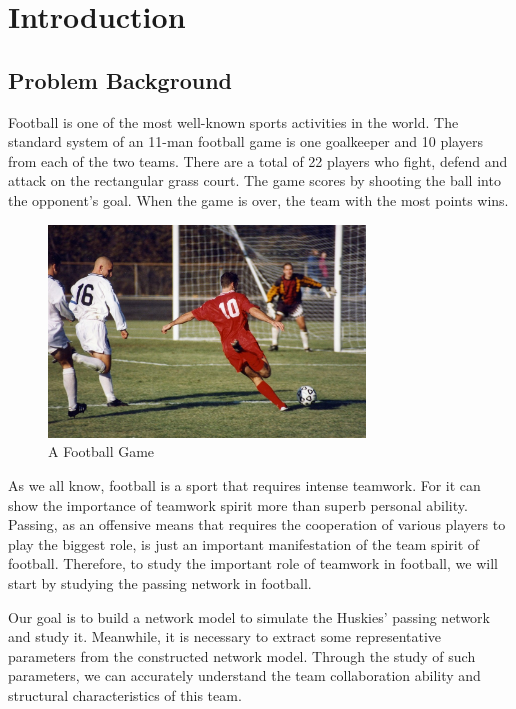 \documentclass{mcmthesis}
\begin{document}
\maketitle

\tableofcontents

\newpage

\section{Introduction}
\subsection{Problem Background}
	Football is one of the most well-known sports activities in the world.  The standard system of an 11-man football game is one goalkeeper and 10 players from each of the two teams. There are a total of 22 players who fight, defend and attack on the rectangular grass court.  The game scores by shooting the ball into the opponent's goal. When the game is over, the team with the most points wins.

	\begin{figure}[h]
		\centering
		\includegraphics[width=0.75\textwidth]{figures/football.jpg}
		\caption{A Football Game~\cite{Wiki_Football}}
		\label{fig:football}
	\end{figure}

	As we all know, football is a sport that requires intense teamwork.  For it can show the importance of teamwork spirit more than superb personal ability.  Passing, as an offensive means that requires the cooperation of various players to play the biggest role, is just an important manifestation of the team spirit of football.  Therefore, to study the important role of teamwork in football, we will start by studying the passing network in football.

	Our goal is to build a network model to simulate the Huskies' passing network and study it.  Meanwhile, it is necessary to extract some representative parameters from the constructed network model.  Through the study of such parameters, we can accurately understand the team collaboration ability and structural characteristics of this team.
\end{document}
